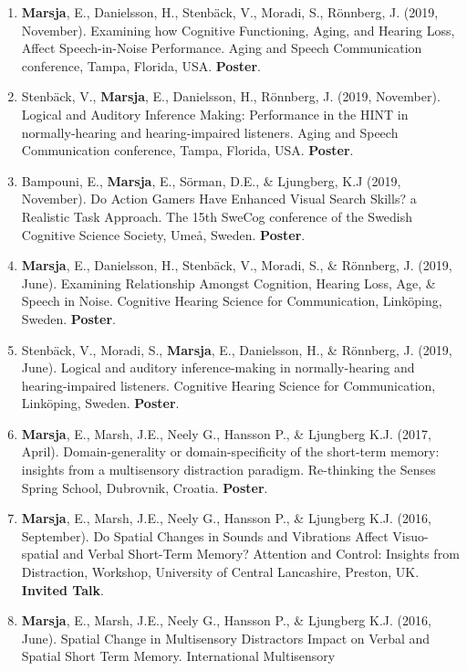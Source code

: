 \documentclass[]{article}
\begin{document}
\begin{enumerate}
\def\labelenumi{\arabic{enumi}.}
\item
  \textbf{Marsja}, E., Danielsson, H., Stenbäck, V., Moradi, S.,
  Rönnberg, J. (2019, November). Examining how Cognitive Functioning,
  Aging, and Hearing Loss, Affect Speech-in-Noise Performance. Aging and
  Speech Communication conference, Tampa, Florida, USA. \textbf{Poster}.
\item
  Stenbäck, V., \textbf{Marsja}, E., Danielsson, H., Rönnberg, J. (2019,
  November). Logical and Auditory Inference Making: Performance in the
  HINT in normally-hearing and hearing-impaired listeners. Aging and
  Speech Communication conference, Tampa, Florida, USA. \textbf{Poster}.
\item
  Bampouni, E., \textbf{Marsja}, E., Sörman, D.E., \& Ljungberg, K.J
  (2019, November). Do Action Gamers Have Enhanced Visual Search Skills?
  a Realistic Task Approach. The 15th SweCog conference of the Swedish
  Cognitive Science Society, Umeå, Sweden. \textbf{Poster}.
\item
  \textbf{Marsja}, E., Danielsson, H., Stenbäck, V., Moradi, S., \&
  Rönnberg, J. (2019, June). Examining Relationship Amongst Cognition,
  Hearing Loss, Age, \& Speech in Noise. Cognitive Hearing Science for
  Communication, Linköping, Sweden. \textbf{Poster}.
\item
  Stenbäck, V., Moradi, S., \textbf{Marsja}, E., Danielsson, H., \&
  Rönnberg, J. (2019, June). Logical and auditory inference-making in
  normally-hearing and hearing-impaired listeners. Cognitive Hearing
  Science for Communication, Linköping, Sweden. \textbf{Poster}.
\item
  \textbf{Marsja}, E., Marsh, J.E., Neely G., Hansson P., \& Ljungberg
  K.J. (2017, April). Domain-generality or domain-specificity of the
  short-term memory: insights from a multisensory distraction paradigm.
  Re-thinking the Senses Spring School, Dubrovnik, Croatia.
  \textbf{Poster}.
\item
  \textbf{Marsja}, E., Marsh, J.E., Neely G., Hansson P., \& Ljungberg
  K.J. (2016, September). Do Spatial Changes in Sounds and Vibrations
  Affect Visuo-spatial and Verbal Short-Term Memory? Attention and
  Control: Insights from Distraction, Workshop, University of Central
  Lancashire, Preston, UK. \textbf{Invited Talk}.
\item
  \textbf{Marsja}, E., Marsh, J.E., Neely G., Hansson P., \& Ljungberg
  K.J. (2016, June). Spatial Change in Multisensory Distractors Impact
  on Verbal and Spatial Short Term Memory. International Multisensory

\end{enumerate}
\end{document}
